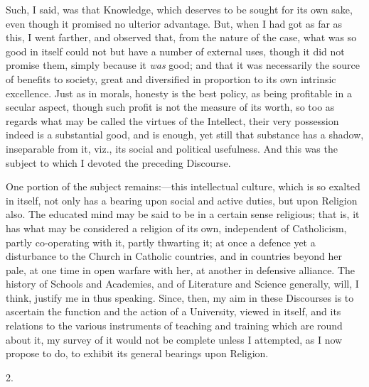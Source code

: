 Such, I said, was that Knowledge, which deserves to be sought for
its own sake, even though it promised no ulterior advantage. But, when
I had got as far as this, I went farther, and observed that, from the
nature of the case, what was so good in itself could not but have a
number of external uses, though it did not promise them, simply
because it \emph{was} good; and that it was necessarily the source of
benefits to society, great and diversified in proportion to its own
intrinsic excellence. Just as in morals, honesty is the best policy,
as being profitable in a secular aspect, though such profit is not the
measure of its worth, so too as regards what may be called the virtues
of the Intellect, their very possession indeed is a substantial good,
and is enough, yet still that substance has a shadow, inseparable from
it, viz., its social and political usefulness. And this was the
subject to which I devoted the preceding Discourse.

One portion of the subject remains:—this intellectual culture,
which is so exalted in itself, not only has a bearing upon social and
active duties, but upon Religion also. The educated mind may be said
to be in a certain sense religious; that is, it has what may be
considered a religion of its own, independent of Catholicism, partly
co-operating with it, partly thwarting it; at once a defence yet a
disturbance to the Church in Catholic countries, and in countries
beyond her pale, at one time in open warfare with her, at another in
defensive alliance. The history of Schools and Academies, and of
Literature and Science generally, will, I think, justify me in thus
speaking. Since, then, my aim in these Discourses is to ascertain the
function and the action of a University, viewed in itself, and its
relations to the various instruments of teaching and training which
are round about it, my survey of it would not be complete unless I
attempted, as I now propose to do, to exhibit its general bearings
upon Religion.

2.

